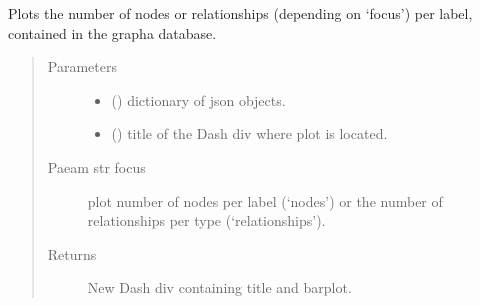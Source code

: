 \documentclass[letterpaper,10pt,english]{sphinxmanual}
\begin{document}

\begin{fulllineitems}
\label{\detokenize{_autosummary/report_manager.apps:report_manager.apps.homepageStats.plot_node_rel_per_label}}
Plots the number of nodes or relationships (depending on ‘focus’) per label, contained in the     grapha database.
\begin{quote}\begin{description}
\item[{Parameters}] \leavevmode\begin{itemize}
\item {} 
 () \textendash{} dictionary of json objects.

\item {} 
 () \textendash{} title of the Dash div where plot is located.

\end{itemize}

\item[{Paeam str focus}] \leavevmode
plot number of nodes per label (‘nodes’) or the number of relationships                                             per type (‘relationships’).

\item[{Returns}] \leavevmode
New Dash div containing title and barplot.

\end{description}\end{quote}

\end{fulllineitems}

\end{document}
